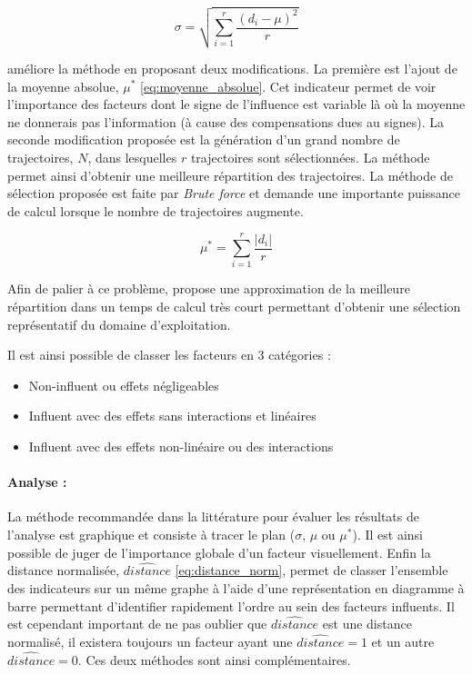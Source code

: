 \begin{equation}\label{eq:ecart_type}
    \sigma = \sqrt{\sum_{i=1}^{r}\frac{(d_{i} - \mu)^{2}}{r}}
\end{equation}

\cite{Campolongo20071509} améliore la méthode en proposant deux modifications. La première
est l’ajout de la moyenne absolue, $\mu^{*}$ \eqref{eq:moyenne_absolue}. Cet indicateur permet
de voir l’importance des facteurs dont le signe de l’influence est variable là où
la moyenne ne donnerais pas l’information (à cause des compensations dues au signes).
La seconde modification proposée est la génération d’un grand nombre de trajectoires, $N$,
dans lesquelles $r$ trajectoires sont sélectionnées. La méthode permet ainsi
d’obtenir une meilleure répartition des trajectoires.
La méthode de sélection proposée est faite par \emph{Brute force} et demande une
importante puissance de calcul lorsque le nombre de trajectoires augmente.

\begin{equation}\label{eq:moyenne_absolue}
    \mu^{*} = \sum_{i = 1}^{r} \frac{\lvert d_{i} \rvert}{r}
\end{equation}

Afin de palier à ce problème, \cite{Ruano2012103} propose une approximation de
la meilleure répartition dans un temps de calcul très court permettant d’obtenir
une sélection représentatif du domaine d’exploitation.

Il est ainsi possible de classer les facteurs en 3 catégories :
\begin{itemize}
  \item Non-influent ou effets négligeables
  \item Influent avec des effets sans interactions et linéaires
  \item Influent avec des effets non-linéaire ou des interactions
\end{itemize}

\paragraph{Analyse :} %
\label{par:analyse}
La méthode recommandée dans la littérature pour évaluer les résultats de l’analyse
est graphique et consiste à tracer le plan ($\sigma$, $\mu$ ou $\mu^{*}$). Il est
ainsi possible de juger de l’importance globale d’un facteur visuellement.
Enfin la distance normalisée, $\hat{distance}$ \eqref{eq:distance_norm}, permet
de classer l’ensemble des indicateurs sur un même graphe à l’aide d’une représentation
en diagramme à barre permettant d’identifier rapidement l’ordre au sein des facteurs influents.
Il est cependant important de ne pas oublier que $\hat{distance}$ est une distance
normalisé, il existera toujours un facteur ayant une $\hat{distance} = 1$ et un autre
$\hat{distance} = 0$. Ces deux méthodes sont ainsi complémentaires.

